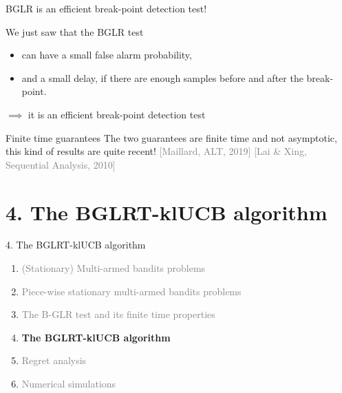 \documentclass[11pt,english,ignorenonframetext,]{beamer}
\begin{document}
\begin{frame}{BGLR is an efficient break-point detection test!}

  We just saw that the BGLR test
  \begin{itemize}
    \item can have a small false alarm probability,
    \item and a small delay, if there are enough samples before and after the break-point.
  \end{itemize}

  $\implies$ it is an efficient break-point detection test

  \pause
  \begin{block}{Finite time guarantees}
    The two guarantees are \alert{finite time} and not asymptotic, this kind of results are quite recent!
    \hfill{}
    \textcolor{gray}{[Maillard, ALT, 2019]}
    \textcolor{gray}{[Lai \& Xing, Sequential Analysis, 2010]}
  \end{block}

\end{frame}


\section{\hfill{}4. The BGLRT-klUCB algorithm\hfill{}}

\begin{frame}{4. The BGLRT-klUCB algorithm}

  \begin{enumerate}
    \item
    \textcolor{gray}{
      (Stationary) Multi-armed bandits problems
    }
    \vspace*{15pt}

    \item
    \textcolor{gray}{
      Piece-wise stationary multi-armed bandits problems
    }
    \vspace*{15pt}

    \item
    \textcolor{gray}{
      The B-GLR test and its finite time properties
    }
    \vspace*{15pt}

    \item
    \alert{\textbf{%
      The BGLRT-klUCB algorithm
    }}
    \vspace*{15pt}

    \item
    \textcolor{gray}{
      Regret analysis
    }
    \vspace*{15pt}

    \item
    \textcolor{gray}{
      Numerical simulations
    }
  \end{enumerate}

\end{frame}
\end{document}
